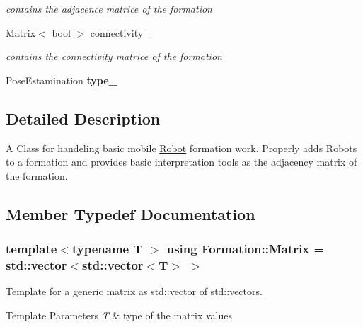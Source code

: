 \begin{DoxyCompactItemize}
\begin{DoxyCompactList}\small\item\em contains the adjacence matrice of the formation \end{DoxyCompactList}\item 
\hyperlink{classFormation_a227cd099c5171dd7a8f66cf010793e4e}{Matrix}$<$ bool $>$ \hyperlink{classFormation_aa33f8090d7ed17b5a70eed9156db713a}{connectivity\+\_\+}\hypertarget{classFormation_aa33f8090d7ed17b5a70eed9156db713a}{}\label{classFormation_aa33f8090d7ed17b5a70eed9156db713a}

\begin{DoxyCompactList}\small\item\em contains the connectivity matrice of the formation \end{DoxyCompactList}\item 
Pose\+Estamination {\bfseries type\+\_\+}\hypertarget{classFormation_a1753db68c71fb1cfc25462dd3e67986e}{}\label{classFormation_a1753db68c71fb1cfc25462dd3e67986e}

\end{DoxyCompactItemize}


\subsection{Detailed Description}
A Class for handeling basic mobile \hyperlink{structFormation_1_1Robot}{Robot} formation work. Properly adds Robots to a formation and provides basic interpretation tools as the adjacency matrix of the formation. 

\subsection{Member Typedef Documentation}
\subsubsection[{\texorpdfstring{Matrix}{Matrix}}]{\setlength{\rightskip}{0pt plus 5cm}template$<$typename T $>$ using {\bf Formation\+::\+Matrix} =  std\+::vector$<$std\+::vector$<$T$>$ $>$}\hypertarget{classFormation_a227cd099c5171dd7a8f66cf010793e4e}{}\label{classFormation_a227cd099c5171dd7a8f66cf010793e4e}


Template for a generic matrix as std\+::vector of std\+::vectors. 


\begin{DoxyTemplParams}{Template Parameters}
{\em T} & type of the matrix values \\
\hline
\end{DoxyTemplParams}


